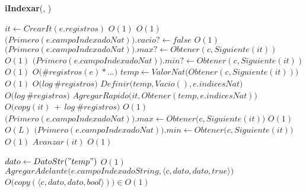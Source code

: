 \begin{Algoritmos}
\begin{algorithm}[H]{\textbf{iIndexar}(, )}
\begin{algorithmic}
      \State $it \gets CrearIt(e.registros)$ \Comment $O(1)$
       \Comment $O(1)$
        \State $\big(Primero(e.campoIndexadoNat)\big).vacio? \gets false$ \Comment $O(1)$ 
        \State $\big(Primero(e.campoIndexadoNat)\big).max? \gets Obtener(c, Siguiente(it))$ \Comment $O(1)$
        \State $\big(Primero(e.campoIndexadoNat)\big).min? \gets Obtener(c, Siguiente(it))$ \Comment $O(1)$
      \EndIf
       \Comment $O\big(\#registros(e) * ...\big)$
        \State $temp \gets ValorNat\big(Obtener(c, Siguiente(it))\big)$ \Comment $O(1)$
         \Comment $O\big(log\ \#registros\big)$
            \State $Definir\big(temp, Vacio(), e.indicesNat\big)$ \Comment $O\big(log\ \#registros\big)$
        \EndIf
        \State $AgregarRapido\big(it, Obtener(temp, e.indicesNat)\big)$ \Comment $O\big(copy(it)\ +\ log\ \#registros\big)$
         \Comment $O(1)$
          \State $\big(Primero(e.campoIndexadoNat)\big).max \gets Obtener\big(c, Siguiente(it)\big)$ \Comment $O(1)$
        \EndIf
         \Comment $O(L)$
          \State $\big(Primero(e.campoIndexadoNat)\big).min \gets Obtener\big(c, Siguiente(it)\big)$ \Comment $O(1)$
        \EndIf
        \State $Avanzar(it)$ \Comment $O(1)$
      \EndWhile
    \Else

  \end{algorithmic}
\end{algorithm}

\clearpage

\begin{algorithm}
  \begin{algorithmic}



      \State $dato \gets DatoStr("temp")$ \Comment $O(1)$
      \State $AgregarAdelante\big(e.campoIndexadoString,  \big\langle c, dato, dato, true\big\rangle\big)$ \Comment $O\big(copy(\langle c, dato, dato, bool\rangle)\big) \in O(1)$
      \State $ $


\end{algorithmic}
\end{algorithm}
\end{Algoritmos}

